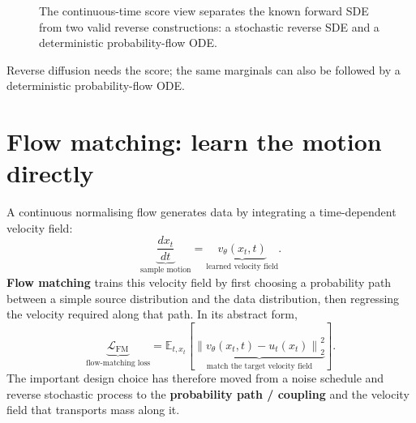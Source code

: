 \begin{figure}[H]
\centering
{}
\caption{The continuous-time score view separates the known forward SDE from two valid reverse constructions: a stochastic reverse SDE and a deterministic probability-flow ODE.}
\label{fig:sde-ode}
\end{figure}

\begin{calloutmemoryhook}
Reverse diffusion needs the score; the same marginals can also be followed by a deterministic probability-flow ODE.
\end{calloutmemoryhook}

\section{Flow matching: learn the motion directly}

A continuous normalising flow generates data by integrating a time-dependent velocity field:
\[
\boxed{
\underbrace{\frac{dx_t}{dt}}_{\text{sample motion}}
=
\underbrace{v_{\theta}(x_t,t)}_{\text{learned velocity field}}
}.
\]
\textbf{Flow matching} trains this velocity field by first choosing a probability path between a simple source distribution and the data distribution, then regressing the velocity required along that path.
In its abstract form,
\[
\underbrace{\mathcal L_{\text{FM}}}_{\text{flow-matching loss}}
=
\mathbb E_{t,x_t}
\left[
\underbrace{\left\|v_\theta(x_t,t)-u_t(x_t)\right\|_2^2}_{\text{match the target velocity field}}
\right].
\]
The important design choice has therefore moved from a noise schedule and reverse stochastic process to the \textbf{probability path / coupling} and the velocity field that transports mass along it.

